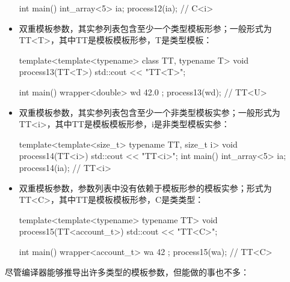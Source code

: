 \begin{itemize}
\begin{cpp}
int main()
{
	int_array<5> ia{};
	process12(ia); // C<i>
}
\end{cpp}

\item
双重模板参数，其实参列表包含至少一个类型模板形参；一般形式为TT<T>，其中TT是模板模板形参，T是类型模板：

\begin{cpp}
template<template<typename> class TT, typename T>
void process13(TT<T>) { std::cout << "TT<T>\n"; }

int main()
{
	wrapper<double> wd{ 42.0 };
	process13(wd); // TT<U>
}
\end{cpp}

\item
双重模板参数，其实参列表包含至少一个非类型模板实参；一般形式为TT<i>，其中TT是模板模板形参，i是非类型模板实参：

\begin{cpp}
template<template<size_t> typename TT, size_t i>
void process14(TT<i>) { std::cout << "TT<i>\n"; }
int main()
{
	int_array<5> ia{};
	process14(ia); // TT<i>
}
\end{cpp}

\item
双重模板参数，参数列表中没有依赖于模板形参的模板实参；形式为TT<C>，其中TT是模板模板形参，C是类类型：

\begin{cpp}
template<template<typename> typename TT>
void process15(TT<account_t>) { std::cout << "TT<C>\n"; }

int main()
{
	wrapper<account_t> wa{ {42} };
	process15(wa); // TT<C>
}
\end{cpp}
\end{itemize}

尽管编译器能够推导出许多类型的模板参数，但能做的事也不多：

